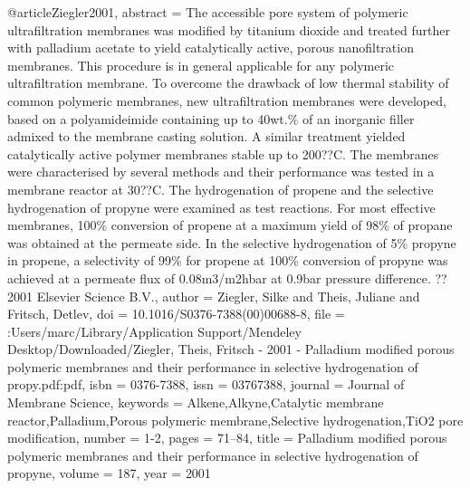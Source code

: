 @article{Ziegler2001,
abstract = {The accessible pore system of polymeric ultrafiltration membranes was modified by titanium dioxide and treated further with palladium acetate to yield catalytically active, porous nanofiltration membranes. This procedure is in general applicable for any polymeric ultrafiltration membrane. To overcome the drawback of low thermal stability of common polymeric membranes, new ultrafiltration membranes were developed, based on a polyamideimide containing up to 40wt.{\%} of an inorganic filler admixed to the membrane casting solution. A similar treatment yielded catalytically active polymer membranes stable up to 200??C. The membranes were characterised by several methods and their performance was tested in a membrane reactor at 30??C. The hydrogenation of propene and the selective hydrogenation of propyne were examined as test reactions. For most effective membranes, 100{\%} conversion of propene at a maximum yield of 98{\%} of propane was obtained at the permeate side. In the selective hydrogenation of 5{\%} propyne in propene, a selectivity of 99{\%} for propene at 100{\%} conversion of propyne was achieved at a permeate flux of 0.08m3/m2hbar at 0.9bar pressure difference. ?? 2001 Elsevier Science B.V.},
author = {Ziegler, Silke and Theis, Juliane and Fritsch, Detlev},
doi = {10.1016/S0376-7388(00)00688-8},
file = {:Users/marc/Library/Application Support/Mendeley Desktop/Downloaded/Ziegler, Theis, Fritsch - 2001 - Palladium modified porous polymeric membranes and their performance in selective hydrogenation of propy.pdf:pdf},
isbn = {0376-7388},
issn = {03767388},
journal = {Journal of Membrane Science},
keywords = {Alkene,Alkyne,Catalytic membrane reactor,Palladium,Porous polymeric membrane,Selective hydrogenation,TiO2 pore modification},
number = {1-2},
pages = {71--84},
title = {{Palladium modified porous polymeric membranes and their performance in selective hydrogenation of propyne}},
volume = {187},
year = {2001}
}
